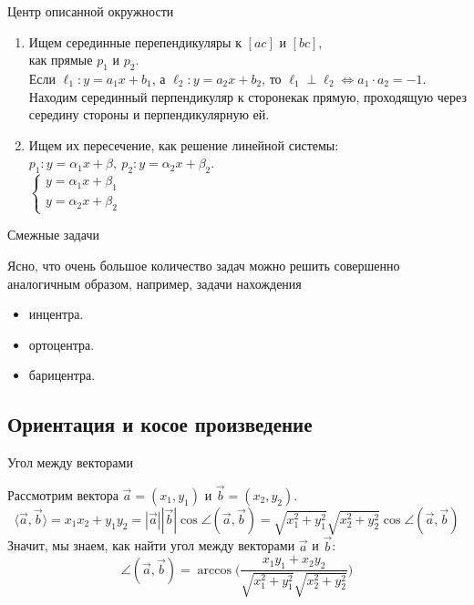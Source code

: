 \begin{frame}{Центр описанной окружности}

	\begin{enumerate}

	    \item Ищем серединные перепендикуляры к $[ac]$ и $[bc]$,\\ как прямые $p_1$ и $p_2$.\\

			  Если $\ell_1\colon y = a_1x + b_1$, а $\ell_2\colon y = a_2 x + b_2$, то $\ell_1 \perp \ell_2 \Leftrightarrow a_1 \cdot a_2 = -1$.\\
			  Находим серединный перпендикуляр к сторонекак прямую, проходящую через середину стороны и перпендикулярную ей.

		\item Ищем их пересечение, как решение линейной системы: \\
			$p_1\colon y = \alpha_1 x + \beta, \ p_2\colon y = \alpha_2 x + \beta_2$.\\
		 	\vspace{1mm}
			$\begin{cases} y = \alpha_1 x + \beta_1 \\ y = \alpha_2 x + \beta_2 \end{cases}$

	\end{enumerate}

\end{frame}

\begin{frame}{Смежные задачи}

	Ясно, что очень большое количество задач можно решить совершенно аналогичным образом, например, задачи
	нахождения

	\begin{itemize}

		\item инцентра.

		\item ортоцентра.

		\item  барицентра.
	\end{itemize}
\end{frame}

\subsection{Ориентация и косое произведение}

\begin{frame}{Угол между векторами}

	Рассмотрим вектора $\vec{a} = (x_1, y_1)$ и $\vec{b} = (x_2, y_2)$.
	\[ \langle \vec{a}, \vec{b} \rangle = x_1 x_2 + y_1 y_2 = |\vec{a}||\vec{b}| \cos{\angle{(\vec{a}, \vec{b})}} = \sqrt{x_1^2 + y_1^2}\sqrt{x_2^2 + y_2^2} \cos{\angle(\vec{a}, \vec{b})}\]
	Значит, мы знаем, как найти угол между векторами $\vec{a}$ и $\vec{b}$:
	\[ \angle(\vec{a}, \vec{b}) = \arccos\bigg(\frac{x_1 y_1 + x_2 y_2}{\sqrt{x_1^2 + y_1^2} \sqrt{x_2^2 + y_2^2}}\bigg) \]

\end{frame}

